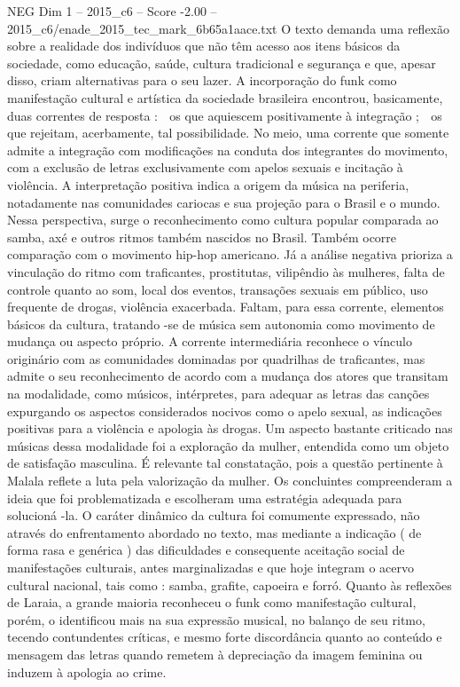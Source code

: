 \begin{textsample}{NEG Dim 1 – 2015\_c6 – Score -2.00 – 2015\_c6/enade\_2015\_tec\_mark\_6b65a1aace.txt}
O texto demanda uma reflexão sobre a realidade dos indivíduos que não têm acesso aos itens básicos da sociedade, como educação, saúde, cultura tradicional e segurança e que, apesar disso, criam alternativas para o seu lazer.
A incorporação do funk como manifestação cultural e artística da sociedade brasileira encontrou, basicamente, duas correntes de resposta :  os que aquiescem positivamente à integração ;  os que rejeitam, acerbamente, tal possibilidade.
No meio, uma corrente que somente admite a integração com modificações na conduta dos integrantes do movimento, com a exclusão de letras exclusivamente com apelos sexuais e incitação à violência.
A interpretação positiva indica a origem da música na periferia, notadamente nas comunidades cariocas e sua projeção para o Brasil e o mundo.
Nessa perspectiva, surge o reconhecimento como cultura popular comparada ao samba, axé e outros ritmos também nascidos no Brasil.
Também ocorre comparação com o movimento hip-hop americano.
Já a análise negativa prioriza a vinculação do ritmo com traficantes, prostitutas, vilipêndio às mulheres, falta de controle quanto ao som, local dos eventos, transações sexuais em público, uso frequente de drogas, violência exacerbada.
Faltam, para essa corrente, elementos básicos da cultura, tratando -se de música sem autonomia como movimento de mudança ou aspecto próprio.
A corrente intermediária reconhece o vínculo originário com as comunidades dominadas por quadrilhas de traficantes, mas admite o seu reconhecimento de acordo com a mudança dos atores que transitam na modalidade, como músicos, intérpretes, para adequar as letras das canções expurgando os aspectos considerados nocivos como o apelo sexual, as indicações positivas para a violência e apologia às drogas.
Um aspecto bastante criticado nas músicas dessa modalidade foi a exploração da mulher, entendida como um objeto de satisfação masculina.
É relevante tal constatação, pois a questão pertinente à Malala reflete a luta pela valorização da mulher.
Os concluintes compreenderam a ideia que foi problematizada e escolheram uma estratégia adequada para solucioná -la.
O caráter dinâmico da cultura foi comumente expressado, não através do enfrentamento abordado no texto, mas mediante a indicação ( de forma rasa e genérica ) das dificuldades e consequente aceitação social de manifestações culturais, antes marginalizadas e que hoje integram o acervo cultural nacional, tais como : samba, grafite, capoeira e forró.
Quanto às reflexões de Laraia, a grande maioria reconheceu o funk como manifestação cultural, porém, o identificou mais na sua expressão musical, no balanço de seu ritmo, tecendo contundentes críticas, e mesmo forte discordância quanto ao conteúdo e mensagem das letras quando remetem à depreciação da imagem feminina ou induzem à apologia ao crime.

\end{textsample}
